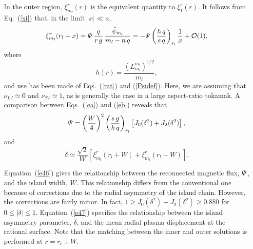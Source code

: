 \documentclass[12pt,prb,aps]{revtex4-1}
\begin{document}
In the outer region,  $\xi_{m_{l}}^r(r)$ is the equivalent quantity to $\xi_1^r(r)$.  It follows from Eq.~(\ref{xi}) that, in the limit $|x|\ll a$, 
\begin{equation}\label{eb}
\xi_{m_{l}}^r(r_{l}+x)={\mit\Psi}\,\frac{q}{r\,g}\,\frac{\hat{\psi}_{m_{l}}}{m_{l}-n\,q}
= -{\mit\Psi}\left(\frac{h\,q}{s\,q}\right)_{r_l}\frac{1}{x} + {\cal O}(1),
\end{equation}
where 
\begin{equation}
h(r) = \frac{(L_{m_{l}}^{m_{l}})^{1/2}}{m_{l}},
\end{equation}
and use has been made of Eqs.~(\ref{rat}) and (\ref{Psidef}). Here, we are assuming that $\nu_{L\,l}\simeq 0$ and $\nu_{S\,l}\simeq 1$,
as is generally the case in a large aspect-ratio tokamak. 
A comparison between Eqs.~(\ref{ea}) and (\ref{eb}) reveals that
\begin{equation}\label{e46}
{\mit\Psi} = \left(\frac{W}{4}\right)^2\left(\frac{s\,g}{h\,q}\right)_{r_{l}}\left[J_0(\delta^2)+ J_2(\delta^2)\right],
\end{equation}
and
\begin{equation}\label{e47}
\delta \simeq \frac{\sqrt{2}}{W}\left[\xi_{m_{l}}^r(r_{l}+W)+\xi_{m_{l}}^r(r_{l}-W)\right].
\end{equation}

Equation~(\ref{e46}) gives the relationship between the reconnected magnetic flux, ${\mit\Psi}$, and the island width, $W$. This relationship
differs from the conventional one\,\cite{ntm1} because of corrections due to the radial asymmetry of the island chain. However, the corrections are fairly
minor. In fact, $1\geq J_0(\delta^2)+ J_2(\delta^2)\geq 0.880$ for $0\leq |\delta|\leq 1$. Equation~(\ref{e47}) specifies the relationship between the
island asymmetry parameter, $\delta$,  and the mean radial plasma displacement at the rational surface. Note that the matching
between the inner and outer solutions is performed at $r=r_{l}\pm W$. 
\end{document}
